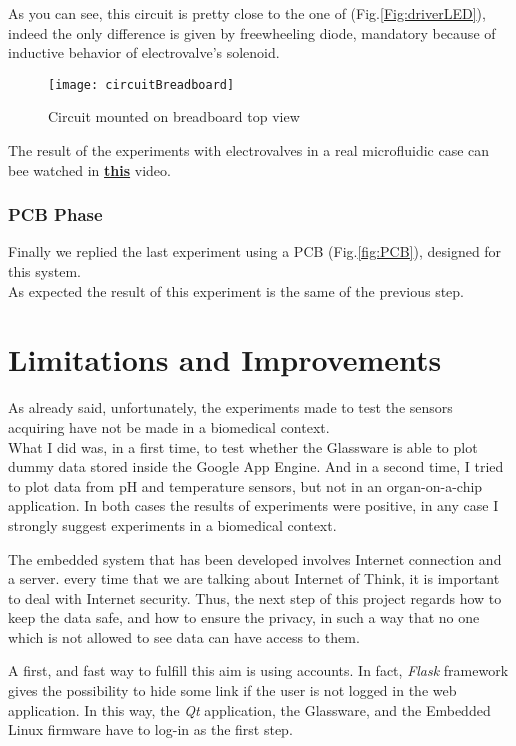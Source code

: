 	As you can see, this circuit is pretty close to the one of (Fig.\ref{Fig:driverLED}), indeed the only difference is given by freewheeling diode, mandatory because of inductive behavior of electrovalve's solenoid.
	
	\begin{figure}[h]
		\centering
		\texttt{[image: circuitBreadboard]}
		\caption{Circuit mounted on breadboard top view}
		\label{Fig:circuitBreadboard}
		
		
	\end{figure}
	
	
	The result of the experiments with electrovalves in a real microfluidic case can bee watched in  \href{https://www.youtube.com/watch?v=CavCVnD2P1k}{\textbf{this}} video.
	
	
	\subsection{PCB Phase}
	
	Finally we replied the last experiment using a PCB (Fig.\ref{fig:PCB}),  designed for this system.\\
	As expected the result of this experiment is the same of the previous step. 
	
	
\chapter{Limitations and Improvements}

As already said, unfortunately, the experiments made to test the sensors acquiring have not be made in a biomedical context.\\
What I did was, in a first time, to test whether the Glassware is able to plot dummy data stored inside the Google App Engine. And in a second time, I tried to plot data from pH and temperature sensors, but not in an organ-on-a-chip application. In both cases the results of experiments were positive, in any case I strongly suggest experiments in a biomedical context.

The embedded system that has been developed involves Internet connection and a server. every time that we are talking about Internet of Think, it is important to deal with Internet security. Thus, the next step of this project regards how to keep the data safe, and how to ensure the privacy, in such a way that no one which is not allowed to see data can have access to them. 

A first, and fast way to fulfill this aim is  using accounts. In fact, \textit{Flask} framework gives the possibility to hide some link if the user is not logged in the web application. In this way, the \textit{Qt} application, the Glassware, and the Embedded Linux firmware have to log-in as the first step.

